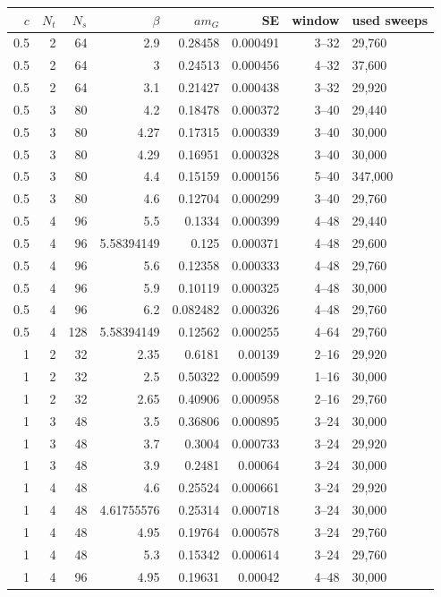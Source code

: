 \begin{longtable}{rrrrrrrl}
\toprule
$c$ & $N_t$ & $N_s$ & $\beta$ & $am_G$ & SE & window & used sweeps\\\midrule\endhead
0.5 & 2 & 64 & 2.9 & 0.28458 & 0.000491 & 3--32 & 29,760\\
0.5 & 2 & 64 & 3 & 0.24513 & 0.000456 & 4--32 & 37,600\\
0.5 & 2 & 64 & 3.1 & 0.21427 & 0.000438 & 3--32 & 29,920\\
0.5 & 3 & 80 & 4.2 & 0.18478 & 0.000372 & 3--40 & 29,440\\
0.5 & 3 & 80 & 4.27 & 0.17315 & 0.000339 & 3--40 & 30,000\\
0.5 & 3 & 80 & 4.29 & 0.16951 & 0.000328 & 3--40 & 30,000\\
0.5 & 3 & 80 & 4.4 & 0.15159 & 0.000156 & 5--40 & 347,000\\
0.5 & 3 & 80 & 4.6 & 0.12704 & 0.000299 & 3--40 & 29,760\\
0.5 & 4 & 96 & 5.5 & 0.1334 & 0.000399 & 4--48 & 29,440\\
0.5 & 4 & 96 & 5.58394149 & 0.125 & 0.000371 & 4--48 & 29,600\\
0.5 & 4 & 96 & 5.6 & 0.12358 & 0.000333 & 4--48 & 29,760\\
0.5 & 4 & 96 & 5.9 & 0.10119 & 0.000325 & 4--48 & 30,000\\
0.5 & 4 & 96 & 6.2 & 0.082482 & 0.000326 & 4--48 & 29,760\\
0.5 & 4 & 128 & 5.58394149 & 0.12562 & 0.000255 & 4--64 & 29,760\\
1 & 2 & 32 & 2.35 & 0.6181 & 0.00139 & 2--16 & 29,920\\
1 & 2 & 32 & 2.5 & 0.50322 & 0.000599 & 1--16 & 30,000\\
1 & 2 & 32 & 2.65 & 0.40906 & 0.000958 & 2--16 & 29,760\\
1 & 3 & 48 & 3.5 & 0.36806 & 0.000895 & 3--24 & 30,000\\
1 & 3 & 48 & 3.7 & 0.3004 & 0.000733 & 3--24 & 29,920\\
1 & 3 & 48 & 3.9 & 0.2481 & 0.00064 & 3--24 & 30,000\\
1 & 4 & 48 & 4.6 & 0.25524 & 0.000661 & 3--24 & 29,920\\
1 & 4 & 48 & 4.61755576 & 0.25314 & 0.000718 & 3--24 & 30,000\\
1 & 4 & 48 & 4.95 & 0.19764 & 0.000578 & 3--24 & 29,760\\
1 & 4 & 48 & 5.3 & 0.15342 & 0.000614 & 3--24 & 29,760\\
1 & 4 & 96 & 4.95 & 0.19631 & 0.00042 & 4--48 & 30,000\\

\end{longtable}
